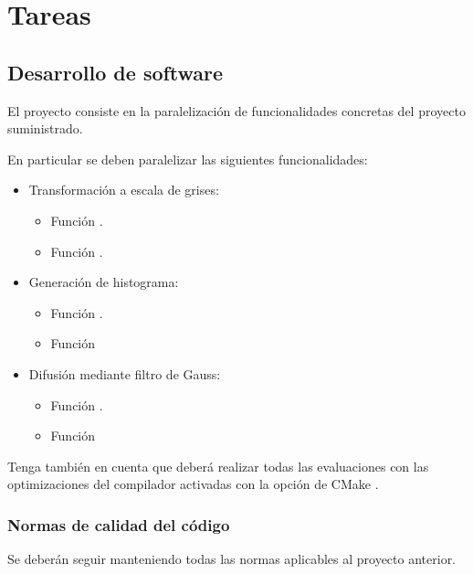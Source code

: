 \section{Tareas}

\subsection{Desarrollo de software}

El proyecto consiste en la paralelización de funcionalidades concretas del proyecto
suministrado.

En particular se deben paralelizar las siguientes funcionalidades:

\begin{itemize}
  \item Transformación a escala de grises:
    \begin{itemize}
      \item Función .
      \item Función .
    \end{itemize}

  \item Generación de histograma:
    \begin{itemize}
      \item Función .
      \item Función 
    \end{itemize}

  \item Difusión mediante filtro de Gauss:
    \begin{itemize}
      \item Función .
      \item Función 
    \end{itemize}
\end{itemize}

Tenga también en cuenta que deberá realizar todas las evaluaciones con las
optimizaciones del compilador activadas con la opción de CMake
.


\subsubsection{Normas de calidad del código}

Se deberán seguir manteniendo todas las normas aplicables al proyecto anterior.


